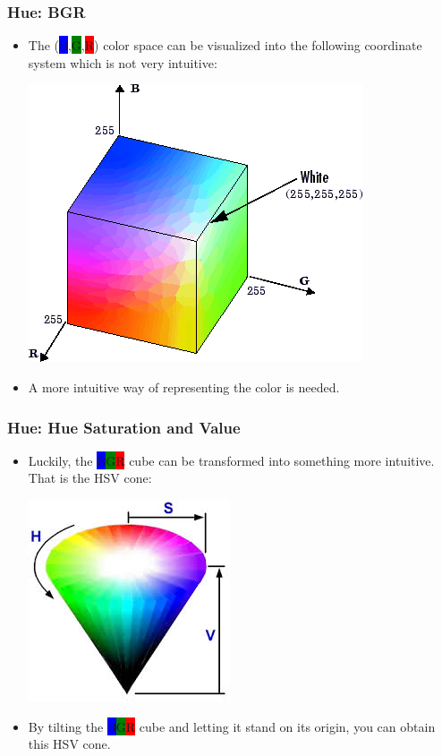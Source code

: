 \documentclass{beamer}
\begin{document}
	
	\begin{frame}
	\frametitle{Hue: BGR}
		\begin{itemize}
			\item The (\colorbox{blue}{B},\colorbox{green}{G},\colorbox{red}{R}) color space can be visualized into the following coordinate system which is not very intuitive:
			
			\includegraphics[scale = 0.7]{RGBcube}
			
			\pause
			
			\item A more intuitive way of representing the color is needed.
		\end{itemize}
	\end{frame}
	
	\begin{frame}
	\frametitle{Hue: Hue Saturation and Value}
		\begin{itemize}
			\item Luckily, the \colorbox{blue}{B}\colorbox{green}{G}\colorbox{red}{R} cube can be transformed into something more intuitive. That is the HSV cone:
			
			\includegraphics[scale = 0.6]{HSVcone}
			
			\pause
			
			\item By tilting the \colorbox{blue}{B}\colorbox{green}{G}\colorbox{red}{R} cube and letting it stand on its origin, you can obtain this HSV cone.
		\end{itemize}
	\end{frame}
	
\end{document}
